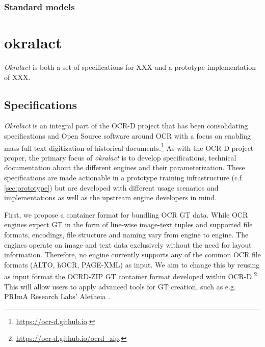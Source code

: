 \documentclass[conference]{IEEEtran}
\begin{document}

\subsubsection{Standard models}




\section{okralact}


\textit{Okralact} is both a set of specifications for XXX and a prototype
implementation of XXX.

\subsection{Specifications}

\textit{Okralact} is an integral part of the OCR-D project that has been
consolidating specifications and Open Source software around OCR
with a focus on enabling mass full text digitization of historical
documents.\footnote{\url{https://ocr-d.github.io}.} As with the
OCR-D project proper, the primary focus of \textit{okralact} is to develop
specifications, technical documentation about the different engines
and their parameterization. These specifications are made
actionable in a prototype training infrastructure (c.f.
\ref{sec:prototype}) but are developed with different usage
scenarios and implementations as well as the upstream engine
developers in mind.

First, we propose a container format for bundling OCR GT data.
While OCR engines expect GT in the form of line-wise image-text
tuples and supported file formats, encodings, file structure and
naming vary from engine to engine. The engines operate on image and
text data exclusively without the need for layout information.
Therefore, no engine currently supports any of the common OCR
file formats (ALTO, hOCR, PAGE-XML) as input. We aim to change this by
reusing as input format the OCRD-ZIP GT container format developed within
OCR-D.\footnote{\url{https://ocr-d.github.io/ocrd_zip}.} \cite{boenig2019datech} This will
allow users to apply advanced tools for GT creation, such as e.g. 
PRImA Research Labs' Aletheia \cite{clausner2011aletheia}.
\end{document}
